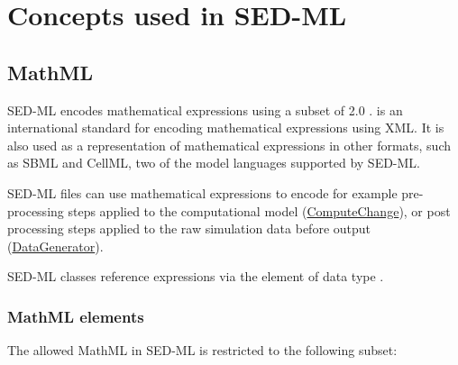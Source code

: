\pagebreak
\chapter{Concepts used in SED-ML}
\label{chp:concepts}
\section{MathML}
\label{sec:mathML}
SED-ML encodes mathematical expressions using a subset of  2.0 \citep{CIM+01}.  is an international standard for encoding mathematical expressions using XML. It is also used as a representation of mathematical expressions in other formats, such as SBML and CellML, two of the model languages supported by SED-ML. 

SED-ML files can use mathematical expressions to encode for example pre-processing steps applied to the computational model (\hyperref[class:computeChange]{ComputeChange}), or post processing steps applied to the raw simulation data before output (\hyperref[class:dataGenerator]{DataGenerator}). 

SED-ML classes reference  expressions via the element \hyperref[sec:math]{} of data type \hyperref[type:mathml]{}.

\subsection{MathML elements}
The allowed MathML in SED-ML is restricted to the following subset: 

